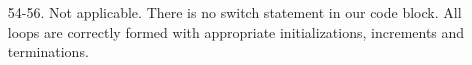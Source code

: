\begin{itemize}
\item [54-56.] Not applicable. There is no switch statement in our code block. All loops are correctly formed with appropriate initializations, increments and terminations. 
\end{itemize}